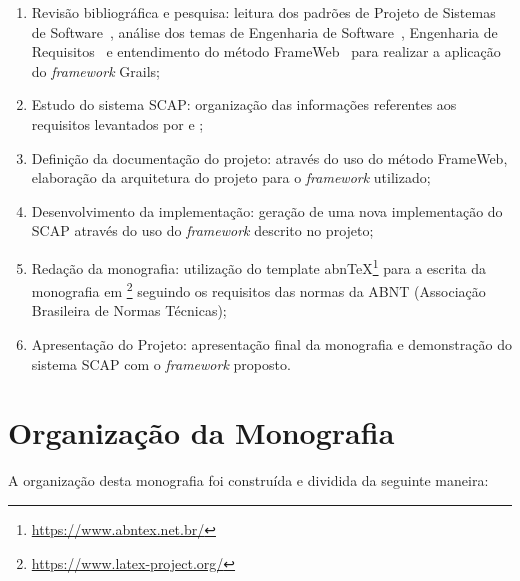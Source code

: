 \begin{enumerate}

    \item Revisão bibliográfica e pesquisa: leitura dos padrões de Projeto de Sistemas de Software~\cite{falbo:pss18}, análise dos temas de Engenharia de Software~\cite{falbo:es14}, Engenharia de Requisitos~\cite{falbo:er17} e entendimento do método FrameWeb~\cite{souza:masterthesis07} para realizar a aplicação do \textit{framework} Grails;
    \item Estudo do sistema SCAP: organização das informações referentes aos requisitos levantados por  e ;
    \item Definição da documentação do projeto: através do uso do método FrameWeb, elaboração da arquitetura do projeto para o \textit{framework} utilizado;
    \item Desenvolvimento da implementação: geração de uma nova implementação do SCAP através do uso do \textit{framework} descrito no projeto; 
    \item Redação da monografia: utilização do template abnTeX\footnote{\url{https://www.abntex.net.br/}} para a escrita da monografia em \latex\footnote{\url{https://www.latex-project.org/}} seguindo os requisitos das normas da ABNT (Associação Brasileira de Normas Técnicas);
    \item Apresentação do Projeto: apresentação final da monografia e demonstração do sistema SCAP com o \textit{framework} proposto.

\end{enumerate}    


\section{Organização da Monografia}
\label{sec-intro-organizacao}


A organização desta monografia foi construída e dividida da seguinte maneira:

